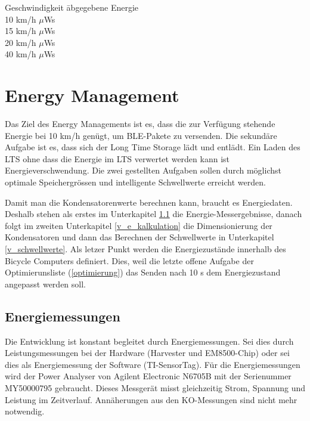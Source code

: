 \begin{tabbing}
    Geschwindigkeit   	\quad\= abgegebene Energie    \\[0.8ex]
    10 km/h		         $\mu$Ws\\
	15 km/h		         $\mu$Ws\\
	20 km/h		         $\mu$Ws\\
	40 km/h		         $\mu$Ws\\
\end{tabbing}

\section{Energy Management}

Das Ziel des Energy Managements ist es, dass die zur Verfügung stehende Energie bei 10 km/h genügt, um BLE-Pakete zu versenden. Die sekundäre Aufgabe ist es, dass sich der Long Time Storage lädt und entlädt. Ein Laden des LTS ohne dass die Energie im LTS verwertet werden kann ist Energieverschwendung. Die zwei gestellten Aufgaben sollen durch möglichst optimale Speichergrössen und intelligente Schwellwerte erreicht werden.

Damit man die Kondensatorenwerte berechnen kann, braucht es Energiedaten. Deshalb stehen als erstes im Unterkapitel \ref{v_messungen_sensortag} die Energie-Messergebnisse, danach folgt im zweiten Unterkapitel \ref{v_e_kalkulation} die Dimensionierung der Kondensatoren und dann das Berechnen der Schwellwerte in Unterkapitel \ref{v_schwellwerte}. Als letzer Punkt werden die Energiezustände innerhalb des Bicycle Computers definiert. Dies, weil die letzte offene Aufgabe der Optimierunsliste (\ref{optimierung}) das Senden nach 10 s dem Energiezustand angepasst werden soll.


\subsection{Energiemessungen}
\label{v_messungen_sensortag}


Die Entwicklung ist konstant begleitet durch Energiemessungen. Sei dies durch Leistungsmessungen bei der Hardware (Harvester und EM8500-Chip) oder sei dies als Energiemessung der Software (TI-SensorTag). Für die Energiemessungen wird der Power Analyser von Agilent Electronic N6705B mit der Serienummer MY50000795 gebraucht. Dieses Messgerät misst gleichzeitig Strom, Spannung und Leistung im Zeitverlauf. Annäherungen aus den KO-Messungen sind nicht mehr notwendig.

